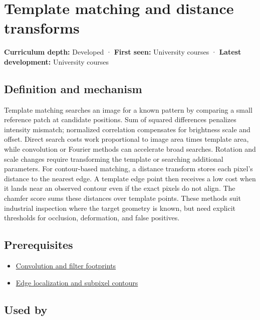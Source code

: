\hypertarget{appendix-5fb4af80d1c7}{}\label{referencestart:appendix-5fb4af80d1c7}
\section{Template matching and distance transforms}\label{appendix-5fb4af80d1c7-template-matching-and-distance-transforms}

\textbf{Curriculum depth:} Developed · \textbf{First seen:} University courses · \textbf{Latest development:} University courses

\subsection{Definition and mechanism}\label{appendix-5fb4af80d1c7-definition-and-mechanism}

Template matching searches an image for a known pattern by comparing a small reference patch at candidate positions. Sum of squared differences penalizes intensity mismatch; normalized correlation compensates for brightness scale and offset. Direct search costs work proportional to image area times template area, while convolution or Fourier methods can accelerate broad searches. Rotation and scale changes require transforming the template or searching additional parameters. For contour-based matching, a distance transform stores each pixel's distance to the nearest edge. A template edge point then receives a low cost when it lands near an observed contour even if the exact pixels do not align. The chamfer score sums these distances over template points. These methods suit industrial inspection where the target geometry is known, but need explicit thresholds for occlusion, deformation, and false positives.

\subsection{Prerequisites}\label{appendix-5fb4af80d1c7-prerequisites}

\begin{itemize}
\tightlist
\item
  \hyperref[appendix-d5b3c692d9f0]{Convolution and filter footprints}
\item
  \hyperref[appendix-36022286b03e]{Edge localization and subpixel contours}
\end{itemize}

\subsection{Used by}\label{appendix-5fb4af80d1c7-used-by}

